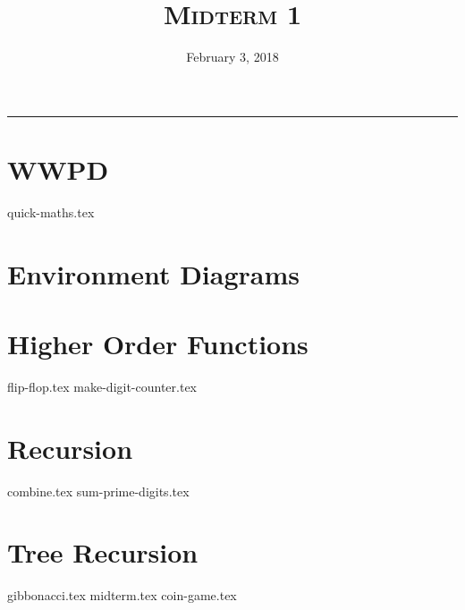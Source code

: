 \documentclass{exam}
\title{\textsc{Midterm 1}}
\date{February 3, 2018}
\begin{document}
\maketitle
\rule{\textwidth}{0.15em}
\fontsize{12}{15}\selectfont


\section{WWPD}
\begin{questions}
{quick-maths.tex}
\end{questions}

\section{Environment Diagrams}

\section{Higher Order Functions}
\begin{questions}
{flip-flop.tex}
\newpage
{make-digit-counter.tex}
\end{questions}

\section{Recursion}
\begin{questions}
{combine.tex}
{sum-prime-digits.tex}
\end{questions}

\section{Tree Recursion}
\begin{questions}
{gibbonacci.tex}
{midterm.tex}
{coin-game.tex}
\end{questions}
\end{document}
